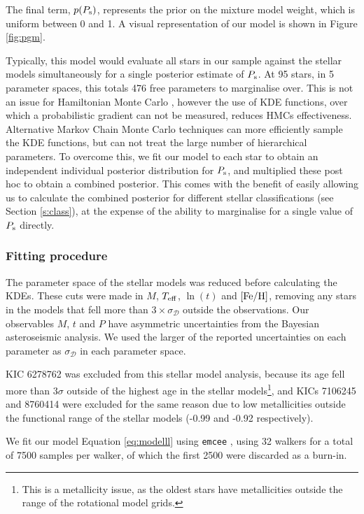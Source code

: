 \documentclass[12pt]{article}
\newcommand{\teff}{\mbox{$T_{\rm eff}$}\xspace}
\newcommand{\feh}{\mbox{$\rm{[Fe/H]}$}\xspace}
\begin{document}
The final term, $p(P_{\rm s})$, represents the prior on the mixture model weight, which is uniform between 0 and 1. A visual representation of our model is shown in Figure \ref{fig:pgm}.

Typically, this model would evaluate all stars in our sample against the stellar models simultaneously for a single posterior estimate of $P_{\rm s}$. At 95 stars, in 5 parameter spaces, this totals 476 free parameters to marginalise over. This is not an issue for Hamiltonian Monte Carlo \cite[HMC]{betancourt+girolami2013}, however the use of KDE functions, over which a probabilistic gradient can not be measured, reduces HMCs effectiveness. Alternative Markov Chain Monte Carlo techniques \cite[MCMC]{foreman-mackey+2013} can more efficiently sample the KDE functions, but can not treat the large number of hierarchical parameters. To overcome this, we fit our model to each star to obtain an independent individual posterior distribution for $P_{\rm s}$, and multiplied these post hoc to obtain a combined posterior. This comes with the benefit of easily allowing us to calculate the combined posterior for different stellar classifications (see Section \ref{s:class}), at the expense of the ability to marginalise for a single value of $P_{\rm s}$ directly. 

\subsubsection{Fitting procedure}
The parameter space of the stellar models was reduced before calculating the KDEs. These cuts were made in $M$, $\teff$, $\ln(t)$ and \feh, removing any stars in the models that fell more than $3 \times \sigma_{\mathcal{D}}$ outside the observations. Our observables $M$, $t$ and $P$ have asymmetric uncertainties from the Bayesian asteroseismic analysis. We used the larger of the reported uncertainties on each parameter as $\sigma_{\mathcal{D}}$ in each parameter space. 

KIC 6278762 was excluded from this stellar model analysis, because its age fell more than $3\sigma$ outside of the highest age in the stellar models\footnote{This is a metallicity issue, as the oldest stars have metallicities outside the range of the rotational model grids.}, and KICs 7106245 and 8760414 were excluded for the same reason due to low metallicities outside the functional range of the stellar models (-0.99 and -0.92 respectively).

We fit our model Equation \ref{eq:modelll} using \texttt{emcee} \cite{foreman-mackey+2013}, using 32 walkers for a total of 7500 samples per walker, of which the first 2500 were discarded as a burn-in.
\end{document}
